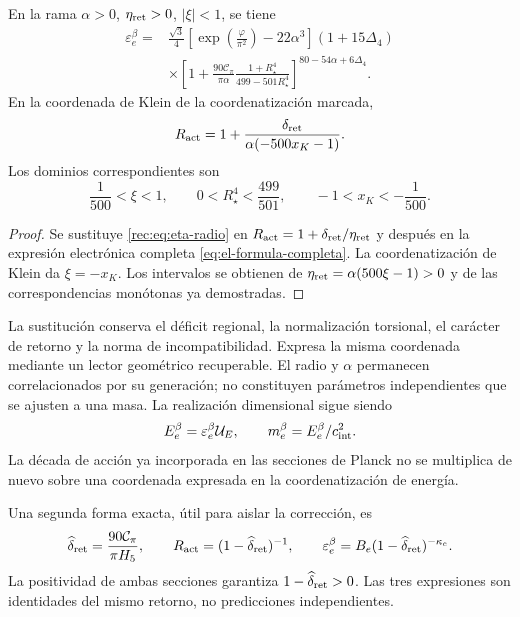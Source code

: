 \begin{corollary}
\label{rec:cor:electron}
En la rama \(\alpha>0\), \(\eta_{\rm ret}>0\), \(|\xi|<1\), se tiene
\begin{align}
 \varepsilon_e^{\beta}={}&
 \frac{\sqrt3}{4}
 \left[\exp\!\left(\frac\varphi{\pi^2}\right)-22\alpha^3\right]
 (1+15\Delta_4)\nonumber\\
 &\times\left[1+\frac{90\mathcal C_\pi}{\pi\alpha}
 \frac{1+R_\star^4}{499-501R_\star^4}\right]^{80-54\alpha+6\Delta_4}.
 \label{rec:eq:electron-radio}
\end{align}
En la coordenada de Klein de la coordenatización marcada,
\begin{equation}
 R_{\rm act}=1+
 \frac{\delta_{\rm ret}}{\alpha(-500x_K-1)}.
 \label{rec:eq:accion-klein}
\end{equation}
Los dominios correspondientes son
\[
 \frac1{500}<\xi<1,\qquad
 0<R_\star^4<\frac{499}{501},\qquad
 -1<x_K<-\frac1{500}.
\]
\end{corollary}
\begin{proof}
Se sustituye \eqref{rec:eq:eta-radio} en \(R_{\rm act}=1+\delta_{\rm ret}/\eta_{\rm ret}\) y después en la expresión electrónica completa \eqref{eq:el-formula-completa}. La coordenatización de Klein da \(\xi=-x_K\). Los intervalos se obtienen de \(\eta_{\rm ret}=\alpha(500\xi-1)>0\) y de las correspondencias monótonas ya demostradas.
\end{proof}

La sustitución conserva el déficit regional, la normalización torsional, el carácter de retorno y la norma de incompatibilidad. Expresa la misma coordenada mediante un lector geométrico recuperable. El radio y \(\alpha\) permanecen correlacionados por su generación; no constituyen parámetros independientes que se ajusten a una masa. La realización dimensional sigue siendo
\[
 E_e^{\beta}=\varepsilon_e^{\beta}\mathcal U_E,\qquad
 m_e^{\beta}=E_e^{\beta}/c_{\rm int}^2.
\]
La década de acción ya incorporada en las secciones de Planck no se multiplica de nuevo sobre una coordenada expresada en la coordenatización de energía.

Una segunda forma exacta, útil para aislar la corrección, es
\[
 \widehat\delta_{\rm ret}=\frac{90\mathcal C_\pi}{\pi H_5},\qquad
 R_{\rm act}=(1-\widehat\delta_{\rm ret})^{-1},\qquad
 \varepsilon_e^{\beta}=B_e(1-\widehat\delta_{\rm ret})^{-\kappa_e}.
\]
La positividad de ambas secciones garantiza \(1-\widehat\delta_{\rm ret}>0\). Las tres expresiones son identidades del mismo retorno, no predicciones independientes.

